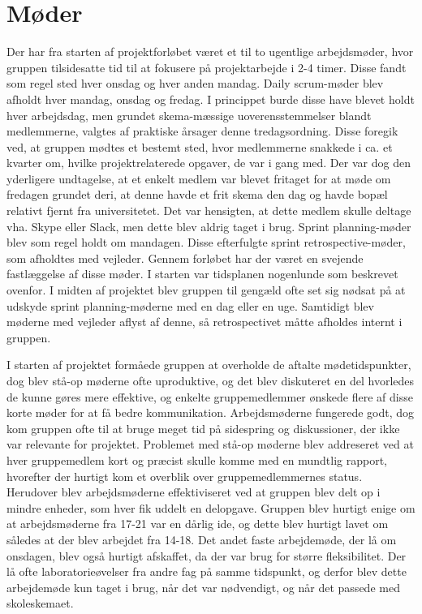 \section{Møder}
Der har fra starten af projektforløbet været et til to ugentlige arbejdsmøder, hvor gruppen tilsidesatte tid til at fokusere på projektarbejde i 2-4 timer. Disse
fandt som regel sted hver onsdag og hver anden mandag. Daily scrum-møder blev afholdt hver mandag, onsdag og fredag. I princippet burde disse have blevet holdt
hver arbejdsdag, men grundet skema-mæssige uoverensstemmelser blandt medlemmerne, valgtes af praktiske årsager denne tredagsordning. Disse foregik ved, at gruppen
mødtes et bestemt sted, hvor medlemmerne snakkede i ca. et kvarter om, hvilke projektrelaterede opgaver, de var i gang med. Der var dog den yderligere undtagelse,
at et enkelt medlem var blevet fritaget for at møde om fredagen grundet deri, at denne havde et frit skema den dag og havde bopæl relativt fjernt fra universitetet.
Det var hensigten, at dette medlem skulle deltage vha. Skype eller Slack, men dette blev aldrig taget i brug. Sprint planning-møder blev som regel holdt om mandagen.
Disse efterfulgte sprint retrospective-møder, som afholdtes med vejleder. Gennem forløbet har der været en svejende fastlæggelse af disse møder. I starten var
tidsplanen nogenlunde som beskrevet ovenfor. I midten af projektet blev gruppen til gengæld ofte set sig nødsat på at udskyde sprint planning-møderne med en dag
eller en uge. Samtidigt blev møderne med vejleder aflyst af denne, så retrospectivet måtte afholdes internt i gruppen.

I starten af projektet formåede gruppen at overholde de aftalte mødetidspunkter, dog blev stå-op møderne ofte uproduktive, og det blev diskuteret en del
hvorledes de kunne gøres mere effektive, og enkelte gruppemedlemmer ønskede flere af disse korte møder for at få bedre kommunikation. Arbejdsmøderne fungerede 
godt, dog kom gruppen ofte til at bruge meget tid på sidespring og diskussioner, der ikke var relevante for projektet.
Problemet med stå-op møderne blev addreseret ved at hver gruppemedlem kort og præcist skulle komme med en mundtlig rapport, hvorefter der hurtigt kom et overblik
over gruppemedlemmernes status. Herudover blev arbejdsmøderne effektiviseret ved at gruppen blev delt op i mindre enheder, som hver fik uddelt en delopgave. 
Gruppen blev hurtigt enige om at arbejdsmøderne fra 17-21 var en dårlig ide, og dette blev hurtigt lavet om således at der blev arbejdet fra 14-18.
Det andet faste arbejdemøde, der lå om onsdagen, blev også hurtigt afskaffet, da der var brug for større fleksibilitet. Der lå ofte laboratorieøvelser
fra andre fag på samme tidspunkt, og derfor blev dette arbejdemøde kun taget i brug, når det var nødvendigt, og når det passede med skoleskemaet.    

